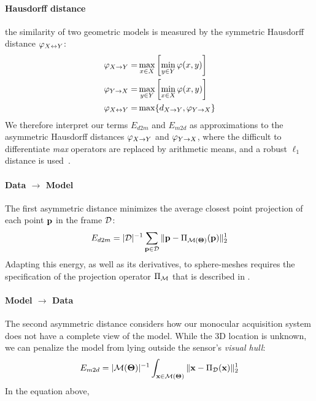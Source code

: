\paragraph{Hausdorff distance} 
 the similarity of two geometric models is measured by the symmetric Hausdorff distance $\varphi_{X \leftrightarrow Y}$:
% 
\begin{eqnarray*}
\varphi_{X \rightarrow Y} =& \max_{x \in X} \left[ \min_{y \in Y} \varphi(x,y) \right] \\
\varphi_{Y \rightarrow X} =& \max_{y \in Y} \left[ \min_{x \in X} \varphi(x,y) \right] \\
\varphi_{X \leftrightarrow Y} =& \max \{ d_{X \rightarrow Y}, \varphi_{Y \rightarrow X} \}
\end{eqnarray*}
We therefore interpret our terms $E_{d2m}$ and $E_{m2d}$ as approximations to the asymmetric Hausdorff distances $\varphi_{X \rightarrow Y}$ and $\varphi_{Y \rightarrow X}$, where the difficult to differentiate \emph{max} operators are replaced by arithmetic means, and a robust $\ell_1$ distance is used~\cite{regcourse}.



\paragraph{Data $\rightarrow$ Model}
The first asymmetric distance minimizes the average closest point projection of each point $\mathbf{p}$ in the  frame $\mathcal{D}$:
%
\begin{equation}
E_{d2m} = |\mathcal{D}|^{-1} \sum_{\mathbf{p} \in \mathcal{D}} \| \mathbf{p} - \Pi_{\mathcal{M}(\boldsymbol{\Theta})}(\mathbf{p})\|_2^1
\label{eq:d2m}
\end{equation}
% 
Adapting this energy, as well as its derivatives, to sphere-meshes requires the specification of the projection operator $\Pi_{\mathcal{M}}$ that is described in .

\paragraph{Model $\rightarrow$ Data}
The second asymmetric distance considers how our monocular acquisition system does not have a complete view of the model. While the 3D location is unknown, we can penalize the model from lying outside the sensor's \emph{visual hull}:
\begin{equation}
E_{m2d} = |\mathcal{M}(\boldsymbol{\Theta})|^{-1} \int_{\mathbf{x} \in \mathcal{M}(\boldsymbol{\Theta})} \| \mathbf{x} - \Pi_{\mathcal{D}}(\mathbf{x})\|_2^1
\label{eq:m2d}
\end{equation}
In the equation above, 

